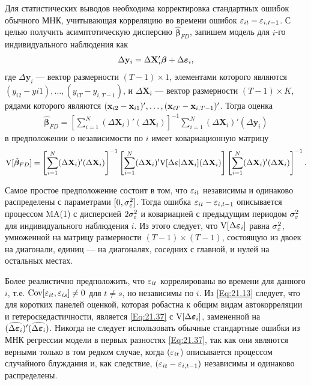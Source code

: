 Для  статистических выводов необходима корректировка стандартных ошибок обычного МНК, учитывающая корреляцию во времени ошибок $\varepsilon_{it}-\varepsilon_{i,t-1}$. С целью получить асимптотическую дисперсию $\hat{\bm\beta}_{FD}$, запишем модель для $i$-го индивидуального наблюдения как
\begin{align}
\Delta \mathbf y_i=\Delta \mathbf X'_i \bm\beta + \Delta \bm{\varepsilon}_i,
\nonumber
\end{align}
где $\Delta \mathbf y_i$ --- вектор размерности $(T-1)\times 1$, элементами которого являются $(y_{i2}-y{i1}), \dots, (y_{iT}-y_{i,T-1})$, и $\Delta \mathbf X_i$ --- вектор размерности $(T-1)\times K$, рядами которого являются $(\mathbf{x}_{i2}-\mathbf{x}_{i1})', \dots, (\mathbf{x}_{iT}-\mathbf{x}_{i,T-1})'$. Тогда оценка
\begin{align}
\hat{\bm\beta}_{FD}=\left[\sum^N_{i=1} (\Delta \mathbf X_i)'(\Delta \mathbf X_i)\right]^{-1}
\sum^N_{i=1} (\Delta \mathbf X_i)'(\Delta \mathbf y_i)
\label{Eq:21.36}
\end{align}
в предположении о независимости по $i$ имеет ковариационную матрицу
\begin{align}
\mathrm V[\hat{\bm\beta}_{FD}]=\left[\sum^N_{i=1} (\Delta \mathbf X_i)'(\Delta \mathbf X_i)\right]^{-1}
\left[\sum^N_{i=1} (\Delta \mathbf X_i)' 
\mathrm V[\Delta \bm{\varepsilon}| \Delta \mathbf X_i]
(\Delta \mathbf X_i)\right]
\left[\sum^N_{i=1} (\Delta \mathbf X_i)'(\Delta \mathbf X_i)\right]^{-1}.
\label{Eq:21.37}
\end{align}

Самое простое предположение состоит в том, что $\varepsilon_{it}$ независимы и одинаково распределены с параметрами $[0,\sigma^2_\varepsilon]$. Тогда ошибка $\varepsilon_{it}-\varepsilon_{i,t-1}$ описывается процессом MA(1) с дисперсией $2\sigma^2_\varepsilon$ и ковариацией с предыдущим периодом $\sigma^2_\varepsilon$ для индивидуального наблюдения $i$. Из этого следует, что $\mathrm V[\Delta \bm{\varepsilon}_i]$  равна $\sigma_\varepsilon^2$, умноженной на матрицу размерности $(T-1)\times (T-1)$, состоящую из двоек на диагонали, единиц --- на диагоналях, соседних с главной, и нулей на остальных местах.

Более реалистично предположить, что $\varepsilon_{it}$ коррелированы во времени для данного $i$, т.е. $\mathrm{Cov}[\varepsilon_{it}, \varepsilon_{is}] \neq 0$ для $t \neq s$, но независимы по $i$. Из \ref{Eq:21.13} следует, что для коротких панелей оценкой, которая робастна к общим видам автокорреляции и гетероскедастичности, является \ref{Eq:21.37} с $\mathrm V[\Delta \bm{\varepsilon}_i]$, замененной на $(\widehat{\Delta \bm{\varepsilon}_i})'(\widehat{\Delta \bm{\varepsilon}_i})$. Никогда не следует использовать обычные стандартные ошибки из МНК регрессии модели в первых разностях \ref{Eq:21.37}, так как они являются верными только в том редком случае, когда $(\varepsilon_{it}$) описывается процессом случайного блуждания и, как следствие, $(\varepsilon_{it}-\varepsilon_{i,t-1})$ независимы и одинаково распределены.

